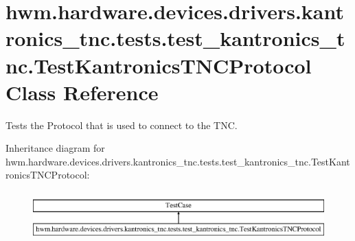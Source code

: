 \hypertarget{classhwm_1_1hardware_1_1devices_1_1drivers_1_1kantronics__tnc_1_1tests_1_1test__kantronics__tnc_fb887f0a11150054eea93748489d0600}{\section{hwm.\-hardware.\-devices.\-drivers.\-kantronics\-\_\-tnc.\-tests.\-test\-\_\-kantronics\-\_\-tnc.\-Test\-Kantronics\-T\-N\-C\-Protocol Class Reference}
\label{classhwm_1_1hardware_1_1devices_1_1drivers_1_1kantronics__tnc_1_1tests_1_1test__kantronics__tnc_fb887f0a11150054eea93748489d0600}
}


Tests the Protocol that is used to connect to the T\-N\-C.  


Inheritance diagram for hwm.\-hardware.\-devices.\-drivers.\-kantronics\-\_\-tnc.\-tests.\-test\-\_\-kantronics\-\_\-tnc.\-Test\-Kantronics\-T\-N\-C\-Protocol\-:\begin{figure}[H]
\begin{center}
\leavevmode
\includegraphics[height=1.927711cm]{classhwm_1_1hardware_1_1devices_1_1drivers_1_1kantronics__tnc_1_1tests_1_1test__kantronics__tnc_fb887f0a11150054eea93748489d0600}
\end{center}
\end{figure}
